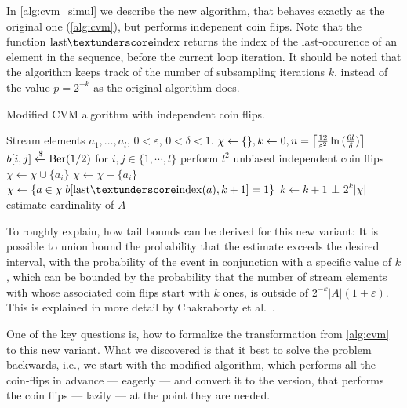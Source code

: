 In \cref{alg:cvm_simul} we describe the new algorithm, that behaves exactly as the original one (\cref{alg:cvm}), but performs indepenent coin flips.
Note that the function $\mathrm{last{\textunderscore}index}$ returns the index of the last-occurence of an element in the sequence, before the current loop iteration.
It should be noted that the algorithm keeps track of the number of subsampling iterations $k$, instead of the value $p = 2^{-k}$ as the original algorithm does.
%
\begin{algorithm}[h!]
	\caption{Modified CVM algorithm with independent coin flips.}\label{alg:cvm_simul}
	\begin{algorithmic}[1]
  \Require Stream elements $a_1,\dots,a_l$, $0 < \varepsilon$, $0 < \delta < 1$.
  \State $\chi \gets \{\}, k \gets 0, n = \ceil*{\frac{12}{\varepsilon^2} \ln{(\frac{6l}{\delta})} }$
  \State $b[i,j] \getsr \Ber(1/2)$ for $i,j \in \{1,\cdots,l\}$ \Comment perform $l^2$ unbiased independent coin flips
      \State $\chi \gets \chi \cup \{a_i\}$
    \Else
      \State $\chi \gets \chi - \{a_i\}$
    \EndIf
      \State $\chi \gets \{a \in \chi | b[\mathrm{last{\textunderscore}index}(a),k+1] = 1\}$
      \State $k \gets k+1$
    \EndIf
      \State \Return $\bot$
    \EndIf
  \EndFor
  \State \Return $2^k |\chi|$ \Comment estimate cardinality of $A$
  \end{algorithmic}
\end{algorithm}
To roughly explain, how tail bounds can be derived for this new variant:
It is possible to union bound the probability that the estimate exceeds the desired interval, with the probability of the event in conjunction with a specific value of $k$, which can be bounded by the probability that the number of stream elements with whose associated coin flips start with $k$ ones, is outside of $2^{-k} |A| (1 \pm \varepsilon)$.
This is explained in more detail by Chakraborty et al.~\cite{chakraborty2022}.

One of the key questions is, how to formalize the transformation from \cref{alg:cvm} to this new variant.
What we discovered is that it best to solve the problem backwards, i.e., we start with the modified algorithm, which performs all the coin-flips in advance --- eagerly --- and convert it to the version, that performs the coin flips --- lazily --- at the point they are needed.

